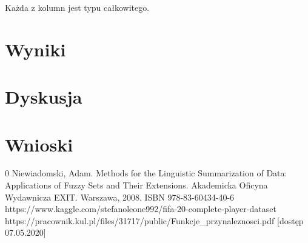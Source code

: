 \documentclass{classrep}
\begin{document}
	Każda z kolumn jest typu całkowitego.
	
	
	\section{Wyniki} %
	
	\section{Dyskusja} %
	
	\section{Wnioski}
		
	
	\begin{thebibliography} {0}
		 Niewiadomski, Adam. Methods for the Linguistic Summarization of Data: Applications of Fuzzy Sets and Their Extensions. Akademicka Oficyna Wydawnicza EXIT. Warszawa, 2008. ISBN 978-83-60434-40-6
		 https://www.kaggle.com/stefanoleone992/fifa-20-complete-player-dataset 
		 https://pracownik.kul.pl/files/31717/public/Funkcje\_przynaleznosci.pdf [dostęp 07.05.2020]
		
	\end{thebibliography}
\end{document}
